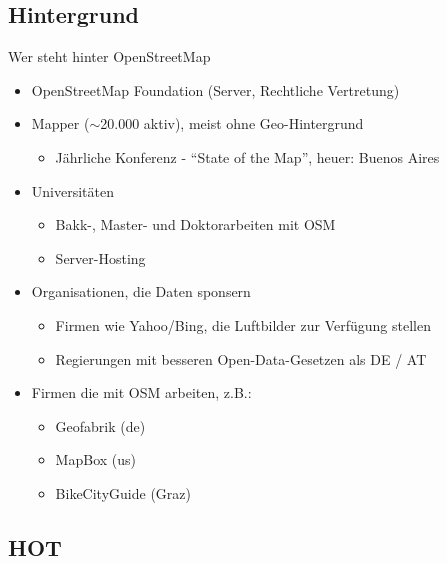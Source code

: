 \documentclass{beamer}
\begin{document}
\subsection{Hintergrund}

\begin{frame}{Wer steht hinter OpenStreetMap}

  \begin{itemize}
    \item OpenStreetMap Foundation (Server, Rechtliche Vertretung)
      \pause
    \item Mapper ($\sim$20.000 aktiv), meist ohne Geo-Hintergrund
    \begin{itemize}
      \item Jährliche Konferenz - "`State of the Map"', heuer: Buenos Aires
    \end{itemize}
      \pause
    \item Universitäten
    \begin{itemize}
      \item Bakk-, Master- und Doktorarbeiten mit OSM
      \item Server-Hosting
    \end{itemize}
      \pause
    \item Organisationen, die Daten sponsern
    \begin{itemize}
      \item Firmen wie Yahoo/Bing, die Luftbilder zur Verfügung stellen
      \item Regierungen mit besseren Open-Data-Gesetzen als DE / AT
    \end{itemize}
      \pause
    \item Firmen die mit OSM arbeiten, z.B.:
    \begin{itemize}
      \item Geofabrik (de)
      \item MapBox (us)
      \item BikeCityGuide (Graz)
    \end{itemize}
  \end{itemize}

\end{frame}

\subsection{HOT}
\end{document}
